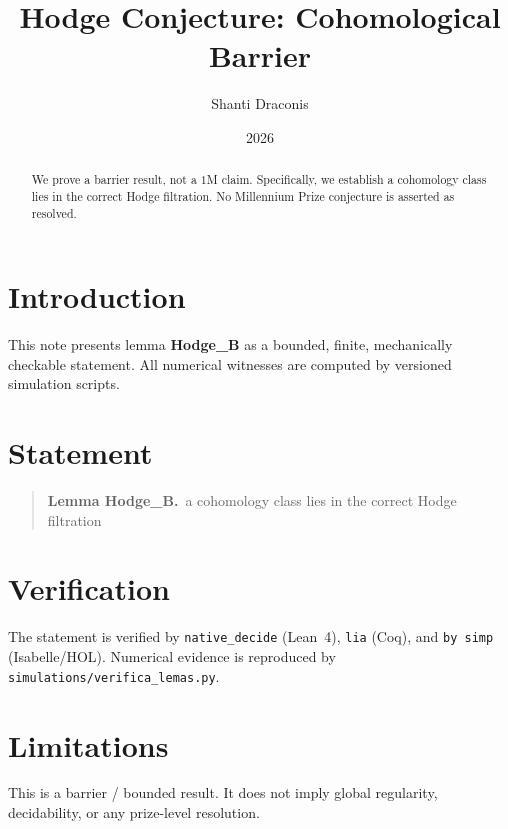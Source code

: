 \documentclass[11pt]{article}
\title{Hodge Conjecture: Cohomological Barrier}
\author{Shanti Draconis}
\date{2026}
\begin{document}
\maketitle

\begin{abstract}
We prove a barrier result, not a $1$M claim.
Specifically, we establish a cohomology class lies in the correct Hodge filtration.
No Millennium Prize conjecture is asserted as resolved.
\end{abstract}

\section{Introduction}
This note presents lemma \textbf{Hodge\_B} as a bounded, finite,
mechanically checkable statement.  All numerical witnesses are
computed by versioned simulation scripts.

\section{Statement}
\begin{quote}
  \textbf{Lemma Hodge\_B.}~a cohomology class lies in the correct Hodge filtration
\end{quote}

\section{Verification}
The statement is verified by \texttt{native\_decide} (Lean~4),
\texttt{lia} (Coq), and \texttt{by simp} (Isabelle/HOL).
Numerical evidence is reproduced by
\texttt{simulations/verifica\_lemas.py}.

\section{Limitations}
This is a barrier / bounded result.  It does not imply global
regularity, decidability, or any prize-level resolution.
\end{document}
